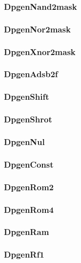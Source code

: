 \documentclass[12pt]{article}
\begin{document}
        \subsubsection{DpgenNand2mask} 
        
        \subsubsection{DpgenNor2mask} 
        
        \subsubsection{DpgenXnor2mask} 
        
        \subsubsection{DpgenAdsb2f} 
        
        \subsubsection{DpgenShift} 
        
        \subsubsection{DpgenShrot} 
        
        \subsubsection{DpgenNul}
        
        \subsubsection{DpgenConst}
        
        \subsubsection{DpgenRom2}
        
        \subsubsection{DpgenRom4}
        
        \subsubsection{DpgenRam}
        
        \subsubsection{DpgenRf1}
        
\end{document}
